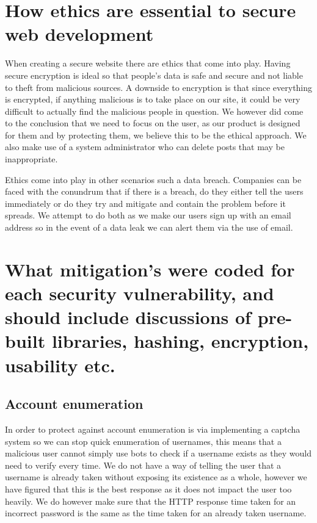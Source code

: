 \documentclass{ueacmpstyle}
\begin{document}
	\section{How ethics are essential to secure web development}
	
	When creating a secure website there are ethics that come into play. Having secure encryption is ideal so that people's data is safe and secure and not liable to theft from malicious sources. A downside to encryption is that since everything is encrypted, if anything malicious is to take place on our site, it could be very difficult to actually find the malicious people in question. We however did come to the conclusion that we need to focus on the user, as our product is designed for them and by protecting them, we believe this to be the ethical approach.  We also make use of a system administrator who can delete posts that may be inappropriate.
	
	Ethics come into play in other scenarios such a data breach. Companies can be faced with the conundrum that if there is a breach, do they either tell the users immediately or do they try and mitigate and contain the problem before it spreads. We attempt to do both as we make our users sign up with an email address so in the event of a data leak we can alert them via the use of email.
	
	
	
	\section{What mitigation's were coded for each security vulnerability, and should include
		discussions of pre-built libraries, hashing, encryption, usability etc.}
	
	\subsection{Account enumeration}
	In order to protect against account enumeration is via implementing a captcha system so we can stop quick enumeration of usernames, this means that a malicious user cannot simply use bots to check if a username exists as they would need to verify every time. We do not have a way of telling the user that a username is already taken without exposing its existence as a whole, however we have figured that this is the best response as it does not impact the user too heavily. We do however make sure that the HTTP response time taken for an incorrect password is the same as the time taken for an already taken username. \cite{accenum}
	
\end{document}
